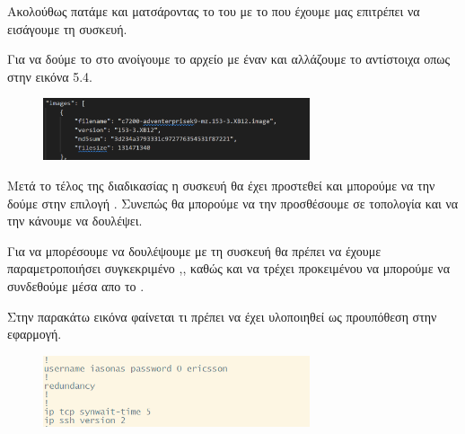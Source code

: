 Ακολούθως πατάμε  και ματσάροντας το  του  με το  που έχουμε μας επιτρέπει να εισάγουμε τη συσκευή.

Για να δούμε το  στο  ανοίγουμε το αρχείο με έναν  και αλλάζουμε το  αντίστοιχα οπως στην  εικόνα 5.4.

\FloatBarrier

\begin{figure}[htb]
	\centering
	\includegraphics[width=0.7\textwidth]{graphics/appliance_filename.png}
	\caption{ }
\end{figure}

\FloatBarrier

Μετά το τέλος της διαδικασίας η συσκευή θα έχει προστεθεί και μπορούμε να την δούμε στην επιλογή .
Συνεπώς θα μπορούμε να την προσθέσουμε σε τοπολογία και να την κάνουμε να δουλέψει.

Για να μπορέσουμε να δουλέψουμε με τη συσκευή θα πρέπει να έχουμε παραμετροποιήσει συγκεκριμένο ,, καθώς και να τρέχει 
προκειμένου να μπορούμε να συνδεθούμε μέσα απο το . 

Στην παρακάτω εικόνα φαίνεται τι πρέπει να έχει υλοποιηθεί ως προυπόθεση στην εφαρμογή.
\FloatBarrier

\begin{figure}[htb]
	\centering
	\includegraphics[width=0.7\textwidth]{graphics/ssh.png}
	\caption{ }
\end{figure}
